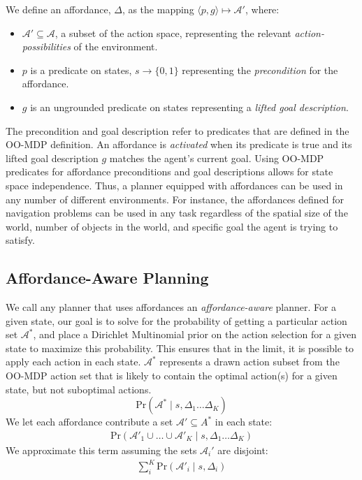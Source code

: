 \documentclass[conference]{IEEEtran}
\begin{document}
We define an affordance, $\Delta$,
as the mapping $\langle p,g\rangle \longmapsto \mathcal{A}'$,
where:
\begin{itemize}
\item[] $\mathcal{A}' \subseteq \mathcal{A}$, a subset of the action space, representing the relevant {\it action-possibilities} of the environment.
\item[] $p$ is a predicate on states, $s \longrightarrow \{$0$, 1\}$
  representing the {\em precondition} for the affordance.
\item[] $g$ is an ungrounded predicate on states representing a {\it lifted goal description}.
\end{itemize}
The precondition and goal description refer to predicates that are defined in the OO-MDP definition.
An affordance is {\it activated} when its predicate is true and its lifted goal description $g$ matches the agent's current goal. 
Using OO-MDP predicates for affordance preconditions and goal descriptions 
allows for state space independence. Thus, a planner equipped with
affordances can be used in any number of different environments. For instance, the affordances defined for 
navigation problems can be used in any task regardless of the spatial size of the world, 
number of objects in the world, and specific goal the agent is trying to satisfy.

\subsection{Affordance-Aware Planning}
We call any planner that
uses affordances an {\it affordance-aware} planner. For a given state, 
our goal is to solve for the probability of getting a particular action set $\mathcal{A}^*$, and place a Dirichlet Multinomial
prior on the action selection for a given state to maximize this probability.
This ensures that in the limit, it is possible to apply each action in each state. $\mathcal{A}^*$ represents
a drawn action subset from the OO-MDP action set that is likely to contain the optimal action(s) for a given state,
but not suboptimal actions.
\begin{equation}
\text{Pr}(\mathcal{A}^* \mid s, \Delta_1 \dots \Delta_K)
\end{equation}
We let each affordance contribute a set $\mathcal{A}' \subseteq A^*$ in each state:
\begin{align}
\text{Pr}(\mathcal{A}'_1 \cup \ldots \cup \mathcal{A}'_K \mid s, \Delta_1 \dots \Delta_K)
\end{align}
We approximate this term assuming the sets $\mathcal{A}_i'$ are disjoint:
\begin{align}
\sum_i^K \text{Pr}(\mathcal{A}'_i \mid s, \Delta_i)
\end{align}
\end{document}
